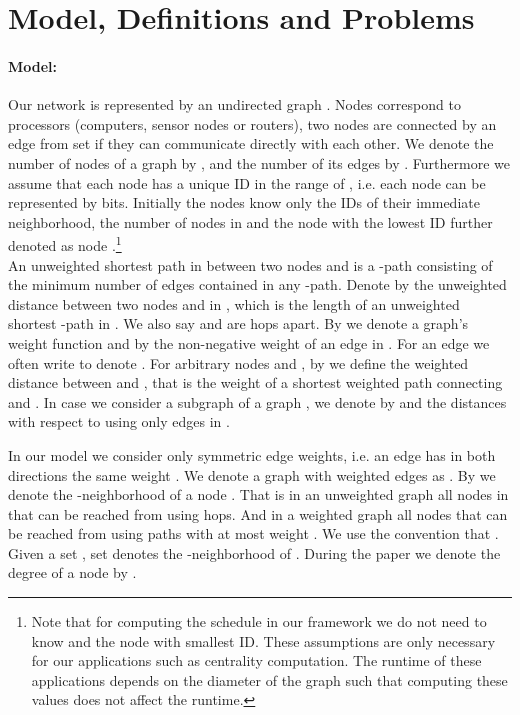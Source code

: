 \documentclass[11pt]{article}
\begin{document}
\section{Model, Definitions and Problems}\label{sec:model}

\paragraph{Model:} Our network is represented by an undirected graph . Nodes  correspond to processors (computers, sensor nodes or routers),
two nodes are connected by an edge from set  if they can communicate directly with each other. We denote the number of nodes of a graph by , and the number of its edges by . Furthermore we assume that each node has a unique ID in the range of , i.e. each node can be represented by  bits. 
Initially the nodes know only  the IDs of their immediate neighborhood, the number of nodes in  and the node with the lowest ID further denoted as node .\footnote{Note that for computing the schedule in our framework we do not need to know  and the node with smallest ID. These assumptions are only necessary for our applications such as centrality computation. The runtime of these applications depends on the diameter of the graph such that computing these values does not affect the runtime.} \\

An unweighted shortest path in  between two nodes  and  is a -path consisting of the minimum number of edges contained in any -path. Denote by  the unweighted distance between two nodes  and  in , which is the length of an unweighted shortest -path in . We also say  and  are  hops apart. By  we denote a graph's weight function and by  the non-negative weight of an edge in . For an edge  we often write  to denote . For arbitrary nodes  and , by  we define the weighted distance between  and , that is the weight of a shortest weighted path connecting  and . In case we consider a subgraph  of a graph , we denote by  and  the distances with respect to using only edges in .

In our model we consider only symmetric edge weights, i.e. an edge  has in both directions the same weight . We denote a graph with weighted edges as . By  we denote the -neighborhood of a node . That is in an unweighted graph all nodes in  that can be reached from  using  hops. And in a weighted graph all nodes that can be reached from  using paths with at most weight .
We use the convention that . Given a set , set  denotes the -neighborhood of . During the paper we denote the degree  of a node  by .
\end{document}
